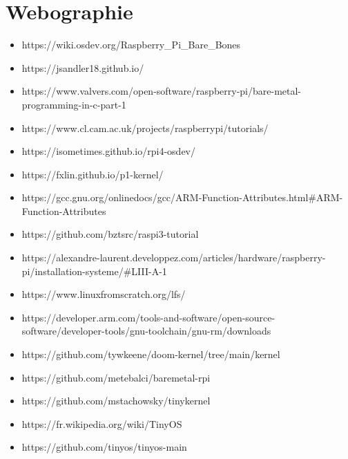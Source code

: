 \documentclass[12pt,a4paper,oneside]{book}
\begin{document}
\chapter{Webographie}
\begin{itemize}
	\item https://wiki.osdev.org/Raspberry\_Pi\_Bare\_Bones\\
	\item https://jsandler18.github.io/\\
	\item https://www.valvers.com/open-software/raspberry-pi/bare-metal-programming-in-c-part-1\\
	\item https://www.cl.cam.ac.uk/projects/raspberrypi/tutorials/\\
	\item https://isometimes.github.io/rpi4-osdev/\\
	\item https://fxlin.github.io/p1-kernel/\\
	\item https://gcc.gnu.org/onlinedocs/gcc/ARM-Function-Attributes.html\#ARM-Function-Attributes\\
	\item https://github.com/bztsrc/raspi3-tutorial\\
	\item https://alexandre-laurent.developpez.com/articles/hardware/raspberry-pi/installation-systeme/\#LIII-A-1\\
	\item https://www.linuxfromscratch.org/lfs/\\
	\item https://developer.arm.com/tools-and-software/open-source-software/developer-tools/gnu-toolchain/gnu-rm/downloads\\
	\item https://github.com/tywkeene/doom-kernel/tree/main/kernel\\
	\item https://github.com/metebalci/baremetal-rpi\\
	\item https://github.com/mstachowsky/tinykernel\\
	\item https://fr.wikipedia.org/wiki/TinyOS\\
	\item https://github.com/tinyos/tinyos-main\\
\end{itemize}
\end{document}
